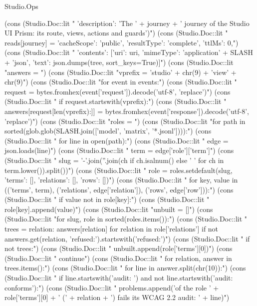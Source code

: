 \begin{lexlean}{Studio.Ops}
\begin{semanticmodule}
{{{    (cons (Studio.Doc::lit "                      'description': 'The ' + journey + ' journey of the Studio UI Prism: its route, views, actions and guards'})\n")
    (cons (Studio.Doc::lit "    reads[journey] = {'cacheScope': 'public', 'resultType': 'complete', 'ttlMs': 0,\n")
    (cons (Studio.Doc::lit "                      'contents': [{'uri': uri, 'mimeType': 'application' + SLASH + 'json', 'text': json.dumps(tree, sort_keys=True)}]}\n")
    (cons (Studio.Doc::lit "answers = {}\n")
    (cons (Studio.Doc::lit "vprefix = 'studio' + chr(9) + 'view' + chr(9)\n")
    (cons (Studio.Doc::lit "for event in events:\n")
    (cons (Studio.Doc::lit "    request = bytes.fromhex(event['request']).decode('utf-8', 'replace')\n")
    (cons (Studio.Doc::lit "    if request.startswith(vprefix):\n")
    (cons (Studio.Doc::lit "        answers[request[len(vprefix):]] = bytes.fromhex(event['response']).decode('utf-8', 'replace')\n")
    (cons (Studio.Doc::lit "roles = {}\n")
    (cons (Studio.Doc::lit "for path in sorted(glob.glob(SLASH.join(['model', 'matrix', '*.jsonl']))):\n")
    (cons (Studio.Doc::lit "    for line in open(path):\n")
    (cons (Studio.Doc::lit "        edge = json.loads(line)\n")
    (cons (Studio.Doc::lit "        term = edge['role']['term']\n")
    (cons (Studio.Doc::lit "        slug = '-'.join(''.join(ch if ch.isalnum() else ' ' for ch in term.lower()).split())\n")
    (cons (Studio.Doc::lit "        role = roles.setdefault(slug, {'terms': [], 'relations': [], 'rows': []})\n")
    (cons (Studio.Doc::lit "        for key, value in (('terms', term), ('relations', edge['relation']), ('rows', edge['row'])):\n")
    (cons (Studio.Doc::lit "            if value not in role[key]:\n")
    (cons (Studio.Doc::lit "                role[key].append(value)\n")
    (cons (Studio.Doc::lit "unbuilt = []\n")
    (cons (Studio.Doc::lit "for slug, role in sorted(roles.items()):\n")
    (cons (Studio.Doc::lit "    trees = {relation: answers[relation] for relation in role['relations'] if not answers.get(relation, 'refused:').startswith('refused:')}\n")
    (cons (Studio.Doc::lit "    if not trees:\n")
    (cons (Studio.Doc::lit "        unbuilt.append(role['terms'][0])\n")
    (cons (Studio.Doc::lit "        continue\n")
    (cons (Studio.Doc::lit "    for relation, answer in trees.items():\n")
    (cons (Studio.Doc::lit "        for line in answer.split(chr(10)):\n")
    (cons (Studio.Doc::lit "            if line.startswith('audit: ') and not line.startswith('audit: conforms'):\n")
    (cons (Studio.Doc::lit "                problems.append('of the role ' + role['terms'][0] + ' (' + relation + ') fails its WCAG 2.2 audit: ' + line)\n")
}}
\end{semanticmodule}
\end{lexlean}
